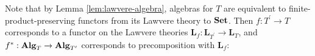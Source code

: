\begin{remark}
  Note that by Lemma \ref{lem:lawvere-algebra}, algebras for $ T $ are equivalent to finite-product-preserving functors from its Lawvere theory to $ \mathbf{Set} $. Then $ f: T^\prime \to T $ corresponds to a functor on the Lawvere theories $ \mathbf L_f: \mathbf L_{T^\prime} \to \mathbf L_T $, and $ f^*: \mathbf{Alg}_{T} \to \mathbf{Alg}_{T^\prime} $ corresponds to precomposition with $ \mathbf L_f $:
  \begin{center}
  \end{center}
\end{remark}


